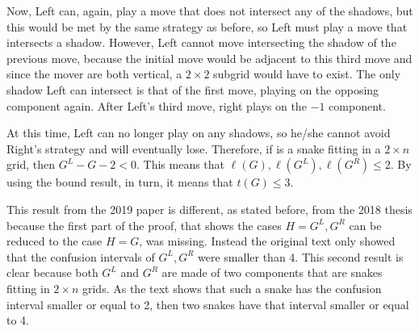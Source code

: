 Now, Left can, again, play a move that does not intersect any of the shadows, but this would be met by the same strategy as before, so Left must play a move that intersects a shadow. However, Left cannot move intersecting the shadow of the previous move, because the initial move would be adjacent to this third move and since the mover are both vertical, a $2\times 2$ subgrid would have to exist. The only shadow Left can intersect is that of the first move, playing on the opposing component again. After Left's third move, right plays on the $-1$ component.

At this time, Left can no longer play on any shadows, so he/she cannot avoid Right's strategy and will eventually lose. Therefore, if \Gm{} is a snake fitting in a $2\times n$ grid, then $G^L - G -2 < 0$. This means that $\ell(G),\ell(G^L),\ell(G^R) \leq 2$. By using the bound result, in turn, it means that $t(G) \leq 3$. 

This result from the 2019 paper \cite{12} is different, as stated before, from the 2018 thesis because the first part of the proof, that shows the cases $H=G^L,G^R$ can be reduced to the case $H=G$, was missing. Instead the original text only showed that the confusion intervals of $G^L,G^R$ were smaller than 4. This second result is clear because both $G^L$ and $G^R$ are made of two components that are snakes fitting in $2\times n$ grids. As the text shows that such a snake has the confusion interval smaller or equal to 2, then two snakes have that interval smaller or equal to 4.















